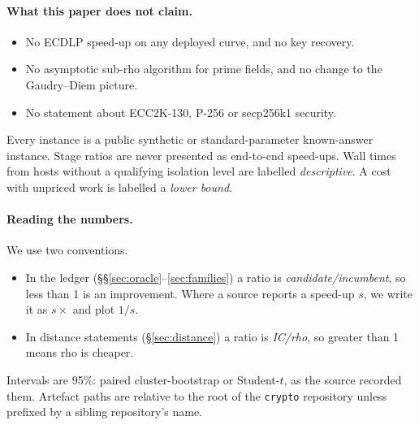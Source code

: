 \paragraph{What this paper does not claim.}
\begin{itemize}
\item No ECDLP speed-up on any deployed curve, and no key recovery.
\item No asymptotic sub-rho algorithm for prime fields, and no change to
  the Gaudry--Diem picture.
\item No statement about ECC2K-130, P-256 or secp256k1 security.
\end{itemize}
Every instance is a public synthetic or standard-parameter known-answer
instance. Stage ratios are never presented as end-to-end speed-ups. Wall
times from hosts without a qualifying isolation level are labelled
\emph{descriptive}. A cost with unpriced work is labelled a \emph{lower
bound}.

\paragraph{Reading the numbers.} We use two conventions.
\begin{itemize}
\item In the ledger (\S\S\ref{sec:oracle}--\ref{sec:families}) a ratio is
  \emph{candidate/incumbent}, so less than 1 is an improvement. Where a
  source reports a speed-up $s$, we write it as $s\times$ and plot $1/s$.
\item In distance statements (\S\ref{sec:distance}) a ratio is \emph{IC/rho},
  so greater than 1 means rho is cheaper.
\end{itemize}
Intervals are 95\%: paired cluster-bootstrap or Student-$t$, as the source
recorded them. Artefact paths are relative to the root of the \texttt{crypto}
repository unless prefixed by a sibling repository's name.
